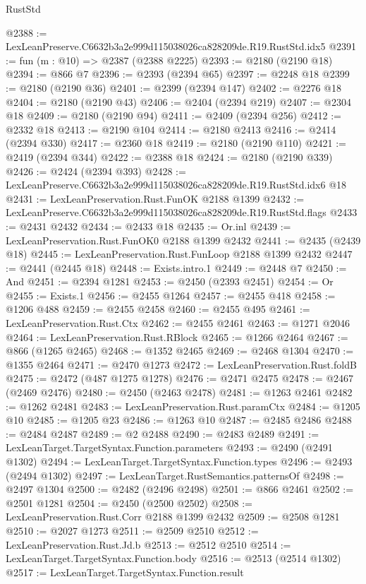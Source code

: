 \begin{lexlean}{RustStd}
\begin{coremodule}
@2388 := LexLeanPreserve.C6632b3a2e999d115038026ca828209de.R19.RustStd.idx5
@2391 := fun (m : @10) => @2387 (@2388 @2225)
@2393 := @2180 (@2190 @18)
@2394 := @866 @7
@2396 := @2393 (@2394 @65)
@2397 := @2248 @18
@2399 := @2180 (@2190 @36)
@2401 := @2399 (@2394 @147)
@2402 := @2276 @18
@2404 := @2180 (@2190 @43)
@2406 := @2404 (@2394 @219)
@2407 := @2304 @18
@2409 := @2180 (@2190 @94)
@2411 := @2409 (@2394 @256)
@2412 := @2332 @18
@2413 := @2190 @104
@2414 := @2180 @2413
@2416 := @2414 (@2394 @330)
@2417 := @2360 @18
@2419 := @2180 (@2190 @110)
@2421 := @2419 (@2394 @344)
@2422 := @2388 @18
@2424 := @2180 (@2190 @339)
@2426 := @2424 (@2394 @393)
@2428 := LexLeanPreserve.C6632b3a2e999d115038026ca828209de.R19.RustStd.idx6 @18
@2431 := LexLeanPreservation.Rust.FunOK @2188 @1399
@2432 := LexLeanPreserve.C6632b3a2e999d115038026ca828209de.R19.RustStd.flags
@2433 := @2431 @2432
@2434 := @2433 @18
@2435 := Or.inl
@2439 := LexLeanPreservation.Rust.FunOK0 @2188 @1399 @2432
@2441 := @2435 (@2439 @18)
@2445 := LexLeanPreservation.Rust.FunLoop @2188 @1399 @2432
@2447 := @2441 (@2445 @18)
@2448 := Exists.intro.{1}
@2449 := @2448 @7
@2450 := And
@2451 := @2394 @1281
@2453 := @2450 (@2393 @2451)
@2454 := Or
@2455 := Exists.{1}
@2456 := @2455 @1264
@2457 := @2455 @418
@2458 := @1206 @488
@2459 := @2455 @2458
@2460 := @2455 @495
@2461 := LexLeanPreservation.Rust.Ctx
@2462 := @2455 @2461
@2463 := @1271 @2046
@2464 := LexLeanPreservation.Rust.RBlock
@2465 := @1266 @2464
@2467 := @866 (@1265 @2465)
@2468 := @1352 @2465
@2469 := @2468 @1304
@2470 := @1355 @2464
@2471 := @2470 @1273
@2472 := LexLeanPreservation.Rust.foldB
@2475 := @2472 (@487 @1275 @1278)
@2476 := @2471 @2475
@2478 := @2467 (@2469 @2476)
@2480 := @2450 (@2463 @2478)
@2481 := @1263 @2461
@2482 := @1262 @2481
@2483 := LexLeanPreservation.Rust.paramCtx
@2484 := @1205 @10
@2485 := @1205 @23
@2486 := @1263 @10
@2487 := @2485 @2486
@2488 := @2484 @2487
@2489 := @2 @2488
@2490 := @2483 @2489
@2491 := LexLeanTarget.TargetSyntax.Function.parameters
@2493 := @2490 (@2491 @1302)
@2494 := LexLeanTarget.TargetSyntax.Function.types
@2496 := @2493 (@2494 @1302)
@2497 := LexLeanTarget.RustSemantics.patternsOf
@2498 := @2497 @1304
@2500 := @2482 (@2496 @2498)
@2501 := @866 @2461
@2502 := @2501 @1281
@2504 := @2450 (@2500 @2502)
@2508 := LexLeanPreservation.Rust.Corr @2188 @1399 @2432
@2509 := @2508 @1281
@2510 := @2027 @1273
@2511 := @2509 @2510
@2512 := LexLeanPreservation.Rust.Jd.b
@2513 := @2512 @2510
@2514 := LexLeanTarget.TargetSyntax.Function.body
@2516 := @2513 (@2514 @1302)
@2517 := LexLeanTarget.TargetSyntax.Function.result

\end{coremodule}
\end{lexlean}
